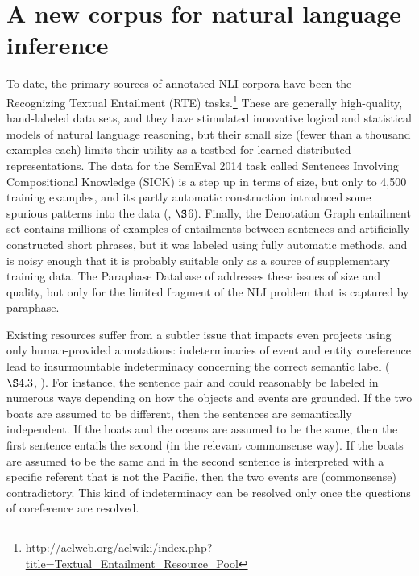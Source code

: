 
\section{A new corpus for natural language inference}\label{sec:discussion}

To date, the primary sources of annotated NLI corpora have been the
Recognizing Textual Entailment (RTE)
tasks.\footnote{\url{http://aclweb.org/aclwiki/index.php?title=Textual_Entailment_Resource_Pool}}
These are generally high-quality, hand-labeled data sets, and they
have stimulated innovative logical and statistical models of natural
language reasoning, but their small size (fewer than a thousand examples each)
limits their utility as a testbed for learned distributed representations. 
The data for the SemEval 2014 task called Sentences Involving Compositional Knowledge (SICK) is a
step up in terms of size, but only to 4,500 training examples, and its
partly automatic construction introduced some spurious patterns into
the data (\citealt{marelli2014semeval}, $\S$6). Finally, the
Denotation Graph entailment set \cite{hodoshimage} contains millions of
examples of entailments between sentences and artificially constructed
short phrases, but it was labeled using fully automatic methods, and is
noisy enough that it is probably suitable only as a source of
supplementary training data. The Paraphase Database of \cite{ganitkevitch2013ppdb}
addresses these issues of size and quality, but only for the limited
fragment of the NLI problem that is captured by paraphase.

Existing resources suffer from a subtler issue that impacts even
projects using only human-provided annotations: indeterminacies of
event and entity coreference lead to insurmountable indeterminacy
concerning the correct semantic label (\citealt{de2008finding} $\S4.3$, \citealt{marelli2014sick}). For
instance, the sentence pair  and  could reasonably be labeled in
numerous ways depending on how the objects and events are grounded. If
the two boats are assumed to be different, then the sentences are semantically
independent. If the boats and the oceans are assumed to be the same,
then the first sentence entails the second (in the relevant
commonsense way). If the boats are assumed to be the same and 
 in the second sentence is interpreted with a specific referent 
that is not the Pacific, then the two events are (commonsense) contradictory. This
kind of indeterminacy can be resolved only once the questions of
coreference are resolved.


